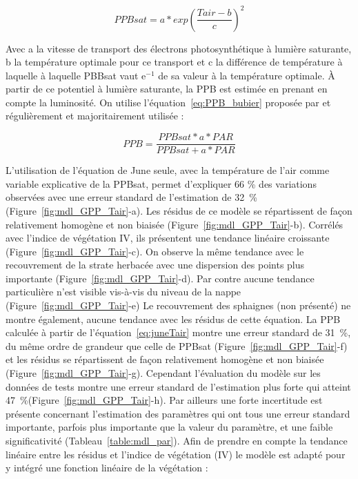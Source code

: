 \begin{equation}\label{eq:juneTair}
PPBsat = a * exp(\frac{Tair - b}{c})^2
\end{equation}

Avec a la vitesse de transport des électrons photosynthétique à lumière saturante, b la température optimale pour ce transport et c la différence de température à laquelle à laquelle PBBsat vaut e$^{-1}$ de sa valeur à la température optimale.
À partir de ce potentiel à lumière saturante, la PPB est estimée en prenant en compte la luminosité.
On utilise l'équation~\ref{eq:PPB_bubier} proposée par \citep{bubier1998} et régulièrement et majoritairement utilisée \citep{bortoluzzi2006,worrall2009}:

\begin{equation} \label{eq:PPB_bubier}
PPB = \frac{PPBsat * a * PAR}{PPBsat + a * PAR}
\end{equation}

L'utilisation de l'équation de June seule, avec la température de l'air comme variable explicative de la PPBsat, permet d'expliquer 66 \% des variations observées avec une erreur standard de l'estimation de \SI{32}{\percent} (Figure~\ref{fig:mdl_GPP_Tair}-a).
Les résidus de ce modèle se répartissent de façon relativement homogène et non biaisée (Figure~\ref{fig:mdl_GPP_Tair}-b).
Corrélés avec l'indice de végétation IV, ils présentent une tendance linéaire croissante (Figure~\ref{fig:mdl_GPP_Tair}-c).
On observe la même tendance avec le recouvrement de la strate herbacée avec une dispersion des points plus importante (Figure~\ref{fig:mdl_GPP_Tair}-d).
Par contre aucune tendance particulière n'est visible vis-à-vis du niveau de la nappe (Figure~\ref{fig:mdl_GPP_Tair}-e)
Le recouvrement des sphaignes (non présenté) ne montre également, aucune tendance avec les résidus de cette équation.
La PPB calculée à partir de l'équation~\ref{eq:juneTair} montre une erreur standard de \SI{31}{\percent}, du même ordre de grandeur que celle de PPBsat (Figure~\ref{fig:mdl_GPP_Tair}-f) et les résidus se répartissent de façon relativement homogène et non biaisée (Figure~\ref{fig:mdl_GPP_Tair}-g).
Cependant l'évaluation du modèle sur les données de tests montre une erreur standard de l'estimation plus forte qui atteint \SI{47}{\percent}(Figure~\ref{fig:mdl_GPP_Tair}-h).
Par ailleurs une forte incertitude est présente concernant l'estimation des paramètres qui ont tous une erreur standard importante, parfois plus importante que la valeur du paramètre, et une faible significativité (Tableau~\ref{table:mdl_par}).
Afin de prendre en compte la tendance linéaire entre les résidus et l'indice de végétation (IV) le modèle est adapté pour y intégré une fonction linéaire de la végétation :

